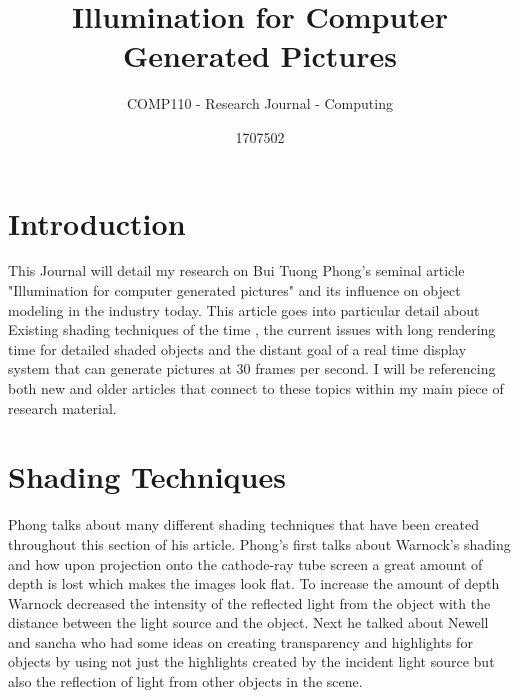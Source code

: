 \documentclass{scrartcl}
\title{Illumination for Computer Generated Pictures}
\subtitle{COMP110 - Research Journal - Computing}
\author{1707502}
\begin{document}
\maketitle


\section{Introduction}

This Journal will detail my research on Bui Tuong Phong's seminal article "Illumination for computer generated pictures" and its influence on object modeling in the industry today. This article goes into particular detail about Existing shading techniques of the time , the current issues with long rendering time for detailed shaded objects and the distant goal of a real time display system that can generate pictures at 30 frames per second. I will be referencing both new and older articles that connect to these topics within my main piece of research material. 

\section{Shading Techniques}

Phong talks about many different shading techniques that have been created throughout this section of his article. Phong’s first talks about Warnock’s shading and how upon projection onto the cathode-ray tube screen a great amount of depth is lost which makes the images look flat. To increase the amount of depth Warnock decreased the intensity of the reflected light from the object with the distance between the light source and the object.  Next he talked about Newell and sancha who had some ideas on creating transparency and highlights for objects by using not just the highlights created by the incident light source but also the reflection of light from other objects in the scene. 
\cite{Phong}




\end{document}
